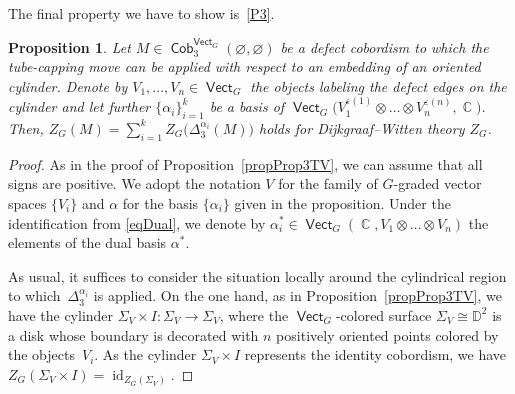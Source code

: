\documentclass[10pt,a4paper]{amsart}
\DeclareMathOperator{\id}{id}
\DeclareMathOperator{\vect}{\mathsf{Vect}}
\DeclareMathOperator{\C}{\mathbb{C}}
\DeclareMathOperator{\Cob}{\mathsf{Cob}}
\numberwithin{equation}{section}
\newtheorem{Proposition}[Proposition]{Proposition}
\theoremstyle{definition}
\begin{document}
The final property we have to show is~\ref{P3}.
\begin{Proposition}\label{propDW3}
Let $M \in \Cob_3^{\vect_G}(\varnothing, \varnothing)$ be a defect cobordism to which the tube-capping move can be applied with respect to an embedding of an oriented cylinder. Denote by $V_1, \dots, V_n \in \vect_G$ the objects labeling the defect edges on the cylinder and let further $\{\alpha_i\}_{i = 1}^k$ be a basis of $\vect_G\bigl(V_1^{\varepsilon(1)} \otimes \dots \otimes V_n^{\varepsilon(n)}, \C\bigr)$. Then, $Z_G(M) = \sum_{i = 1}^{k}Z_G\bigl(\Delta_3^{\alpha_i}(M)\bigr)$ holds for Dijkgraaf--Witten theory $Z_G$.
\end{Proposition}
\begin{proof}
As in the proof of Proposition~\ref{propProp3TV}, we can assume that all signs are positive. We adopt the notation $V$ for the family of $G$-graded vector spaces $\{V_i\}$ and $\alpha$ for the basis $\{\alpha_i\}$ given in the proposition. Under the identification from \eqref{eqDual},
 we denote by $\alpha_i^* \in \vect_G (\C, V_1 \otimes \dots \otimes V_n )$ the elements of the dual basis $\alpha^*$.

 As usual, it suffices to consider the situation locally around the cylindrical region to which~$\Delta_3^{\alpha_i}$ is applied. On the one hand, as in Proposition~\ref{propProp3TV}, we have the cylinder ${\Sigma_V \times I\colon \Sigma_V \rightarrow \Sigma_V}$, where the $\vect_G$-colored surface $\Sigma_V \cong \mathbb{D}^2$ is a disk whose boundary is decorated with $n$ positively oriented points colored by the objects~$V_i$. As the cylinder $\Sigma_V \times I$ represents the identity cobordism, we have $Z_G(\Sigma_V \times I) = \id_{Z_G(\Sigma_V)}$.


\end{proof}
\end{document}
